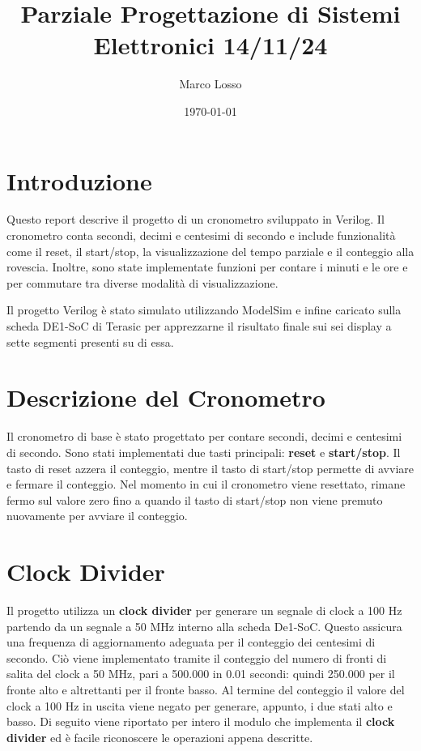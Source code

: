 \documentclass{article}
\title{Parziale Progettazione di Sistemi Elettronici 14/11/24}
\author{Marco Losso}
\date{\today}
\begin{document}
\maketitle

\section{Introduzione}
Questo report descrive il progetto di un cronometro sviluppato in Verilog.
Il cronometro conta secondi, decimi e centesimi di secondo e include funzionalità come il reset, il start/stop, la visualizzazione del tempo parziale e il conteggio alla rovescia.
Inoltre, sono state implementate funzioni per contare i minuti e le ore e per commutare tra diverse modalità di visualizzazione.

Il progetto Verilog è stato simulato utilizzando ModelSim e infine caricato sulla scheda DE1-SoC di Terasic per apprezzarne il risultato finale sui sei display a sette segmenti presenti su di essa.


\section{Descrizione del Cronometro}
Il cronometro di base è stato progettato per contare secondi, decimi e centesimi di secondo. 
Sono stati implementati due tasti principali: \textbf{reset} e \textbf{start/stop}. 
Il tasto di reset azzera il conteggio, mentre il tasto di start/stop permette di avviare e fermare il conteggio. 
Nel momento in cui il cronometro viene resettato, rimane fermo sul valore zero fino a quando il tasto di start/stop non viene premuto nuovamente per avviare il conteggio.

\section{Clock Divider}

Il progetto utilizza un \textbf{clock divider} per generare un segnale di clock a 100 Hz partendo da un segnale a 50 MHz interno alla scheda De1-SoC. 
Questo assicura una frequenza di aggiornamento adeguata per il conteggio dei centesimi di secondo. 
Ciò viene implementato tramite il conteggio del numero di fronti di salita del clock a 50 MHz, pari a 500.000 in 0.01 secondi: quindi 250.000 per il fronte alto e altrettanti per il fronte basso.
Al termine del conteggio il valore del clock a 100 Hz in uscita viene negato per generare, appunto, i due stati alto e basso. 
Di seguito viene riportato per intero il modulo che implementa il \textbf{clock divider} ed è facile riconoscere le operazioni appena descritte.
\end{document}
